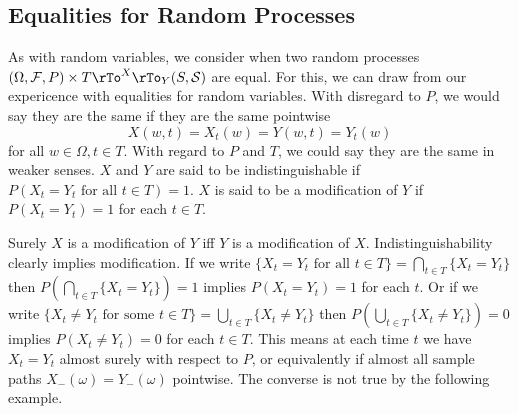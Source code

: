\documentclass[12pt]{amsart}
\theoremstyle{definition}
\begin{document}
\subsection{Equalities for Random Processes} As with random variables, we consider when two random processes $(\Omega, \mathcal{F}, P) \times T \pile{ \rTo^X \\ \rTo_Y} (S, \mathcal{S})$ are equal. For this, we can draw from our expericence with equalities for random variables. With disregard to $P$, we would say they are the same if they are the same pointwise
$$X(w,t) = X_t(w) = Y(w,t) = Y_t(w)$$
for all $w \in \Omega, t \in T$. With regard to $P$ and $T$, we could say they are the same in weaker senses.
\dfn $X$ and $Y$ are said to be indistinguishable if $P(X_t = Y_t \text{ for all } t \in T) = 1$.
\dfn $X$ is said to be a modification of $Y$ if $P(X_t = Y_t) = 1$ for each $t \in T$.

Surely $X$ is a modification of $Y$ iff $Y$ is a modification of $X$. Indistinguishability clearly implies modification. If we write $\{X_t = Y_t \text{ for all } t \in T\} = \bigcap\limits_{t \in T}\{X_t = Y_t\}$ then $P(\bigcap\limits_{t \in T}\{X_t = Y_t\}) = 1$ implies $P(X_t = Y_t) = 1$ for each $t$. Or if we write $\{X_t \neq Y_t \text{ for some } t \in T\} = \bigcup\limits_{t \in T} \{X_t \neq Y_t\}$ then $P(\bigcup\limits_{t \in T} \{X_t \neq Y_t\}) = 0$ implies $P(X_t \neq Y_t) = 0$ for each $t \in T$. This means at each time $t$ we have $X_t = Y_t$ almost surely with respect to $P$, or equivalently if almost all sample paths $X_-(\omega) = Y_-(\omega)$ pointwise. The converse is not true by the following example.
\end{document}
